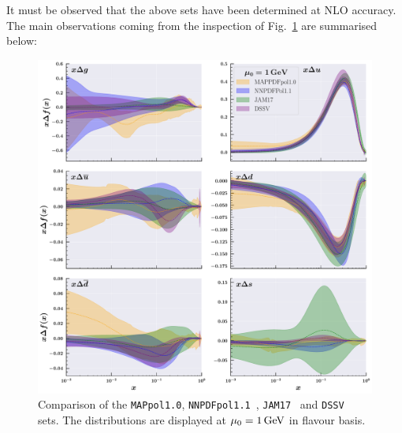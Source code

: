 It must be observed that the above sets have been determined at NLO accuracy. The main observations coming from the inspection of Fig.~\ref{fig:competitors} are summarised below:
\begin{figure}[t!]
  \centering
  \includegraphics[width=\textwidth]{Chapters/Chapter_4/figs/competitors.pdf}
  \caption{\small{Comparison of the \texttt{MAPpol1.0}, \texttt{NNPDFpol1.1}~\cite{Nocera:2014gqa}, \texttt{JAM17}~\cite{Ethier:2017zbq} and \texttt{DSSV}~\cite{deFlorian:2008mr} sets. The distributions are displayed at $\mu_0 = 1 \, \textrm{GeV}$ in flavour basis. }}
  \label{fig:competitors}
\end{figure}
%
